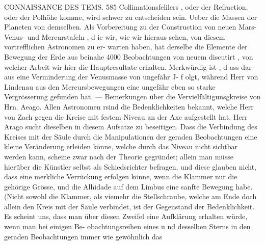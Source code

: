 \documentclass[12pt,a4paper]{article}
\begin{document}
\newpage
CONNAISSANCE DES TEMS. 585\newline
Collimationsfelilers , oder der Refraction, oder der Polhöhe komme, wird schwer zu entscheiden sein.\newline
Ueber die Massen der Planeten von demselben. Als Vorbereitung zu der Construction von neuen Mars-\newline
Venus- und Mercurstafeln , d ie wir, wie wir hieraus sehen, von diesem vortrefflichen Astronomen zu er-\newline
warten haben, hat derselbe die Elemente der Bewegung der Erde aus beinahe 4000 Beobachtungen von\newline
neuem discutirt , von welcher Arbeit wir hier die Hauptresultate erhalten. Merkwürdig ist , d ass dar-\newline
aus eine Verminderung der Venusmasse von ungefähr J- f olgt, während Herr von Lindenau aus den\newline
Mercursbewegungen eine ungefähr eben so starke Vergrösserung gefunden hat. --- Bemerkungen über\newline
die Vervielfältigunsgkreise von Hrn. Aeago. Allen Astronomen rsind die Bedenklichkeiten bekannt,\newline
welche Herr von Zach gegen die Kreise mit festem Niveau an der Axe aufgestellt hat. Herr Arago\newline
sucht dieselben in diesem Aufsatze zu beseitigen. Dass die Verbindung des Kreises mit der Säule durch\newline
die Manipulationen der geraden Beobachtungen eine kleine Veränderung erleiden könne, welche durch\newline
das Niveau nicht sichtbar werden kann, scheine zwar nach der Theorie gegründet; allein man müsse\newline
hierüber die Künstler selbst als Schiedsrichter befragen, und diese glauben nicht, dass eine merkliche\newline
Verrückung erfolgen könne, wenn die Klammer nur die gehörige Grösse, und die Alhidade auf dem\newline
Limbus eine sanfte Bewegung habe. (Nicht sowohl die Klammer, als viemehr die Stellschraube, welche\newline
am Ende doch allein den Kreis mit der Säule verbindet, ist der Gegenstand der Bedenklichkeit. Es\newline
scheint uns, dass man über diesen Zweifel eine Aufklärung erhalten würde, wenn man bei einigen Be-\newline
obachtungsreihen eines u nd desselben Sterns in den geraden Beobachtungen immer wie gewöhnlich das\newline
\end{document}
